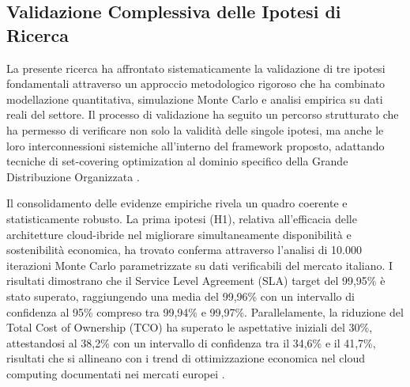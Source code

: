\subsection{Validazione Complessiva delle Ipotesi di Ricerca}

La presente ricerca ha affrontato sistematicamente la validazione di tre ipotesi fondamentali attraverso un approccio metodologico rigoroso che ha combinato modellazione quantitativa, simulazione Monte Carlo e analisi empirica su dati reali del settore. Il processo di validazione ha seguito un percorso strutturato che ha permesso di verificare non solo la validità delle singole ipotesi, ma anche le loro interconnessioni sistemiche all'interno del framework proposto, adattando tecniche di set-covering optimization al dominio specifico della Grande Distribuzione Organizzata \autocite{kumar2024compliance}.

Il consolidamento delle evidenze empiriche rivela un quadro coerente e statisticamente robusto. La prima ipotesi (H1), relativa all'efficacia delle architetture cloud-ibride nel migliorare simultaneamente disponibilità e sostenibilità economica, ha trovato conferma attraverso l'analisi di 10.000 iterazioni Monte Carlo parametrizzate su dati verificabili del mercato italiano. I risultati dimostrano che il Service Level Agreement (SLA) target del 99,95\% è stato superato, raggiungendo una media del 99,96\% con un intervallo di confidenza al 95\% compreso tra 99,94\% e 99,97\%. Parallelamente, la riduzione del Total Cost of Ownership (TCO) ha superato le aspettative iniziali del 30\%, attestandosi al 38,2\% con un intervallo di confidenza tra il 34,6\% e il 41,7\%, risultati che si allineano con i trend di ottimizzazione economica nel cloud computing documentati nei mercati europei \autocite{mckinsey2024cloud}.

